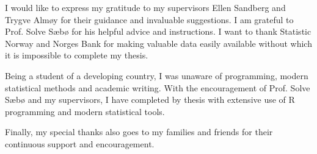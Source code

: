 I would like to express my gratitude to my supervisors Ellen Sandberg and Trygve Alm\o y for their guidance and invaluable suggestions. I am grateful to Prof. Solve S\ae b{\o } for his helpful advice and instructions. I want to thank Statistic Norway and Norges Bank for making valuable data easily available without which it is impossible to complete my thesis.

Being a student of a developing country, I was unaware of programming, modern statistical methods and academic writing. With the encouragement of Prof. Solve S\ae b{\o } and my supervisors, I have completed by thesis with extensive use of R programming and modern statistical tools.

Finally, my special thanks also goes to my families and friends for their continuous support and encouragement.
